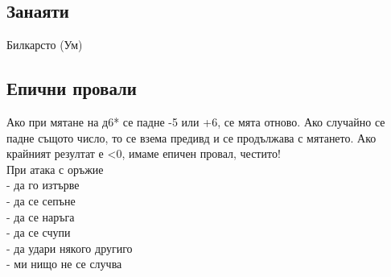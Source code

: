 \subsection{Занаяти}
Билкарсто (Ум)                    \\

\subsection{Епични провали}
Ако при мятане на д6* се падне -5 или +6, се мята отново.
Ако случайно се падне същото число, то се взема предивд и се продължава с мятането.
Ако крайният резултат е <0, имаме епичен провал, честито!  \\

При атака с оръжие           \\
- да го изтърве              \\
- да се сепъне               \\
- да се наръга               \\
- да се счупи                \\
- да удари някого другиго    \\
- ми нищо не се случва       \\
